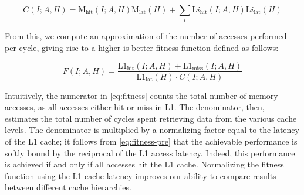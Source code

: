 \begin{equation}
\label{eq:fitness-pre}
    C(I; A, H) = \mathrm{M}_\mathrm{hit}(I; A, H)\mathrm{M}_\mathrm{lat}(H) + \sum_i \mathrm{L}i_\mathrm{hit}(I; A, H)\mathrm{L}i_\mathrm{lat}(H)
\end{equation}

From this, we compute an approximation of the number of accesses performed per cycle, giving rise to a higher-is-better fitness function defined as follows:

\begin{equation}
\label{eq:fitness}
F(I; A, H) = \frac{\mathrm{L1}_\mathrm{hit}(I; A, H) + \mathrm{L1}_\mathrm{miss}(I; A, H)}{\mathrm{L1}_\mathrm{lat}(H)\cdot C(I; A, H)}
\end{equation}

Intuitively, the numerator in \cref{eq:fitness} counts the total number of memory accesses, as all accesses either hit or miss in L1. %
The denominator, then, estimates the total number of cycles spent retrieving data from the various cache levels. The denominator is multiplied by a normalizing factor equal to the latency of the L1 cache; it follows from \cref{eq:fitness-pre} that the achievable performance is softly bound by the reciprocal of the L1 access latency. Indeed, this performance is achieved if and only if all accesses hit the L1 cache. Normalizing the fitness function using the L1 cache latency improves our ability to compare results between different cache hierarchies.
